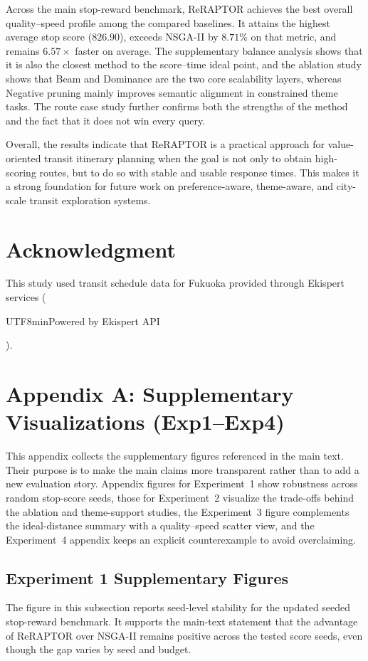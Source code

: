 Across the main stop-reward benchmark, ReRAPTOR achieves the best overall
quality--speed profile among the compared baselines.
It attains the highest average stop score (\(826.90\)), exceeds NSGA-II by
\(8.71\%\) on that metric, and remains \(6.57\times\) faster on average.
The supplementary balance analysis shows that it is also the closest method to
the score--time ideal point, and the ablation study shows that Beam and
Dominance are the two core scalability layers, whereas Negative pruning mainly
improves semantic alignment in constrained theme tasks.
The route case study further confirms both the strengths of the method and the
fact that it does not win every query.

Overall, the results indicate that ReRAPTOR is a practical approach for
value-oriented transit itinerary planning when the goal is not only to obtain
high-scoring routes, but to do so with stable and usable response times.
This makes it a strong foundation for future work on preference-aware,
theme-aware, and city-scale transit exploration systems.

\section*{Acknowledgment}
This study used transit schedule data for Fukuoka provided through Ekispert
services (\begin{CJK*}{UTF8}{min}Powered by Ekispert API\end{CJK*}).




\appendix
\section{Appendix A: Supplementary Visualizations (Exp1--Exp4)}
This appendix collects the supplementary figures referenced in the main text.
Their purpose is to make the main claims more transparent rather than to add a
new evaluation story.
Appendix figures for Experiment~1 show robustness across random stop-score
seeds, those for Experiment~2 visualize the trade-offs behind the ablation and
theme-support studies, the Experiment~3 figure complements the ideal-distance
summary with a quality--speed scatter view, and the Experiment~4 appendix keeps
an explicit counterexample to avoid overclaiming.

\subsection{Experiment 1 Supplementary Figures}
The figure in this subsection reports seed-level stability for the updated
seeded stop-reward benchmark.
It supports the main-text statement that the advantage of ReRAPTOR over
NSGA-II remains positive across the tested score seeds, even though the gap
varies by seed and budget.

